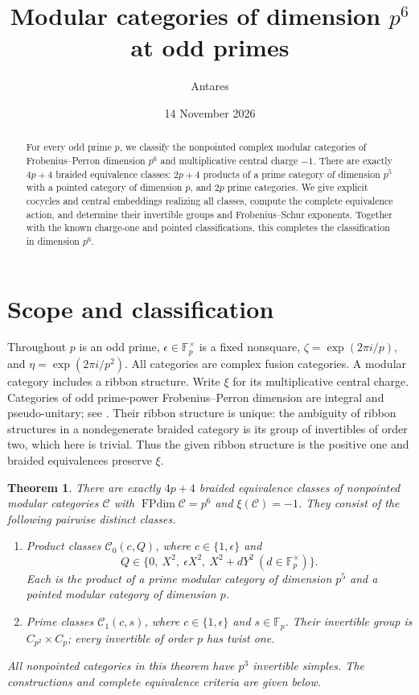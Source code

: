 \documentclass[11pt]{amsart}
\title{Modular categories of dimension $p^6$ at odd primes}
\author{Antares}
\date{14 November 2026}
\newtheorem{theorem}{Theorem}
\theoremstyle{definition}\newtheorem{definition}[theorem]{Definition}
\newcommand{\Fp}{\mathbb F_p}
\newcommand{\FPdim}{\operatorname{FPdim}}
\newcommand{\cC}{\mathcal C}
\begin{document}
\begin{abstract}
For every odd prime $p$, we classify the nonpointed complex modular categories
of Frobenius--Perron dimension $p^6$ and multiplicative central charge $-1$.
There are exactly $4p+4$ braided equivalence classes: $2p+4$ products of a prime
category of dimension $p^5$ with a pointed category of dimension $p$, and $2p$
prime categories. We give explicit cocycles and central embeddings realizing
all classes, compute the complete equivalence action, and determine their
invertible groups and Frobenius--Schur exponents. Together with the known
charge-one and pointed classifications, this completes the classification
in dimension $p^6$.
\end{abstract}
\maketitle

\section{Scope and classification}
Throughout $p$ is an odd prime, $\epsilon\in\Fp^\times$ is a fixed nonsquare,
$\zeta=\exp(2\pi i/p)$, and $\eta=\exp(2\pi i/p^2)$.
All categories are complex fusion categories. A modular category includes a
ribbon structure. Write $\xi$ for its multiplicative central charge.
Categories of odd prime-power Frobenius--Perron dimension are integral and
pseudo-unitary; see \cite[Propositions 8.23--8.24 and Theorem 8.28]{ENO05}.
Their ribbon structure is unique: the ambiguity of ribbon structures in a nondegenerate
braided category is its group of invertibles of order two, which here is trivial.
Thus the given ribbon structure is the positive one and braided equivalences
preserve $\xi$.

\begin{theorem}\label{thm:main}
There are exactly $4p+4$ braided equivalence classes of nonpointed modular
categories $\cC$ with $\FPdim\cC=p^6$ and $\xi(\cC)=-1$.
They consist of the following pairwise distinct classes.
\begin{enumerate}
\item Product classes $\cC_0(c,Q)$, where $c\in\{1,\epsilon\}$ and
\[
 Q\in\{0,\ X^2,\ \epsilon X^2,\ X^2+dY^2\ (d\in\Fp^\times)\}.
\]
Each is the product of a prime modular category of dimension $p^5$ and a
pointed modular category of dimension $p$.
\item Prime classes $\cC_1(c,s)$, where $c\in\{1,\epsilon\}$ and $s\in\Fp$.
Their invertible group is $C_{p^2}\times C_p$; every invertible of order $p$
has twist one.
\end{enumerate}
All nonpointed categories in this theorem have $p^3$ invertible simples.
The constructions and complete equivalence criteria are given below.
\end{theorem}
\end{document}
